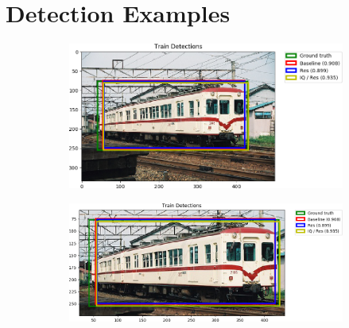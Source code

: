 \section{Detection Examples}\label{sec:detectionappendix}

\begin{figure}[H]
    \centering
    \begin{subfigure}[b]{0.45\textwidth}
        \center
        \includegraphics[width=\textwidth]{Figs/Results/000031_res.png}
        \caption{}\label{fig:}
    \end{subfigure}
    \begin{subfigure}[b]{0.45\textwidth}
        \center
        \includegraphics[width=\textwidth]{Figs/Results/000031_reszoom.png}
        \caption{}\label{fig:}
    \end{subfigure}
    \caption{}
    \label{fig:}
\end{figure} 



